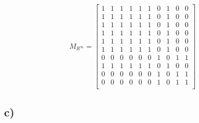 \documentclass[a4paper,10pt]{article}
\begin{document}
\begin{equation}
M_{R^{\infty}} = \begin{bmatrix}
        1 & 1 & 1 & 1 & 1 & 1 & 0 & 1 & 0 & 0 \\[0.3em]
        1 & 1 & 1 & 1 & 1 & 1 & 0 & 1 & 0 & 0 \\[0.3em]
        1 & 1 & 1 & 1 & 1 & 1 & 0 & 1 & 0 & 0 \\[0.3em]
        1 & 1 & 1 & 1 & 1 & 1 & 0 & 1 & 0 & 0 \\[0.3em]
        1 & 1 & 1 & 1 & 1 & 1 & 0 & 1 & 0 & 0 \\[0.3em]
        1 & 1 & 1 & 1 & 1 & 1 & 0 & 1 & 0 & 0 \\[0.3em]
        0 & 0 & 0 & 0 & 0 & 0 & 1 & 0 & 1 & 1 \\[0.3em]
        1 & 1 & 1 & 1 & 1 & 1 & 0 & 1 & 0 & 0 \\[0.3em]
        0 & 0 & 0 & 0 & 0 & 0 & 1 & 0 & 1 & 1 \\[0.3em]
        0 & 0 & 0 & 0 & 0 & 0 & 1 & 0 & 1 & 1 \\[0.3em]
\end{bmatrix}
\end{equation}

\subsection{c)}
\end{document}
